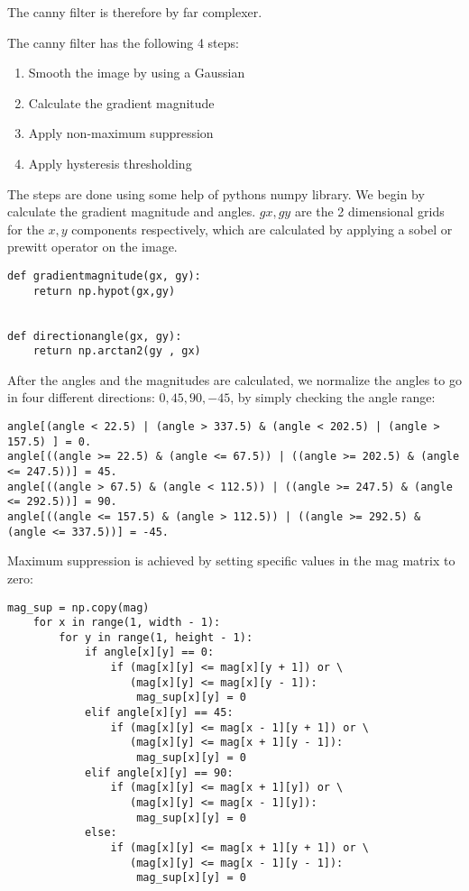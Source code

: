 The canny filter is therefore by far complexer.

The canny filter has the following 4 steps:
\begin{enumerate}
\item Smooth the image by using a Gaussian
\item Calculate the gradient magnitude 
\item Apply non-maximum suppression
\item Apply hysteresis thresholding
\end{enumerate}


The steps are done using some help of pythons numpy library. We begin by calculate the gradient magnitude and angles. $gx,gy$ are the 2 dimensional grids for the $x,y$ components respectively, which are calculated by applying a sobel or prewitt operator on the image.
\begin{verbatim}
def gradientmagnitude(gx, gy):
    return np.hypot(gx,gy)


def directionangle(gx, gy):
    return np.arctan2(gy , gx)
\end{verbatim}

After the angles and the magnitudes are calculated, we normalize the angles to go in four different directions: $0,45,90,-45$, by simply checking the angle range:
\begin{verbatim}
angle[(angle < 22.5) | (angle > 337.5) & (angle < 202.5) | (angle > 157.5) ] = 0.
angle[((angle >= 22.5) & (angle <= 67.5)) | ((angle >= 202.5) & (angle <= 247.5))] = 45.
angle[((angle > 67.5) & (angle < 112.5)) | ((angle >= 247.5) & (angle <= 292.5))] = 90.
angle[((angle <= 157.5) & (angle > 112.5)) | ((angle >= 292.5) & (angle <= 337.5))] = -45.
\end{verbatim}

Maximum suppression is achieved by setting specific values in the mag matrix to zero:

\begin{verbatim}
mag_sup = np.copy(mag)
    for x in range(1, width - 1):
        for y in range(1, height - 1):
            if angle[x][y] == 0:
                if (mag[x][y] <= mag[x][y + 1]) or \
                   (mag[x][y] <= mag[x][y - 1]):
                    mag_sup[x][y] = 0
            elif angle[x][y] == 45:
                if (mag[x][y] <= mag[x - 1][y + 1]) or \
                   (mag[x][y] <= mag[x + 1][y - 1]):
                    mag_sup[x][y] = 0
            elif angle[x][y] == 90:
                if (mag[x][y] <= mag[x + 1][y]) or \
                   (mag[x][y] <= mag[x - 1][y]):
                    mag_sup[x][y] = 0
            else:
                if (mag[x][y] <= mag[x + 1][y + 1]) or \
                   (mag[x][y] <= mag[x - 1][y - 1]):
                    mag_sup[x][y] = 0
\end{verbatim}

